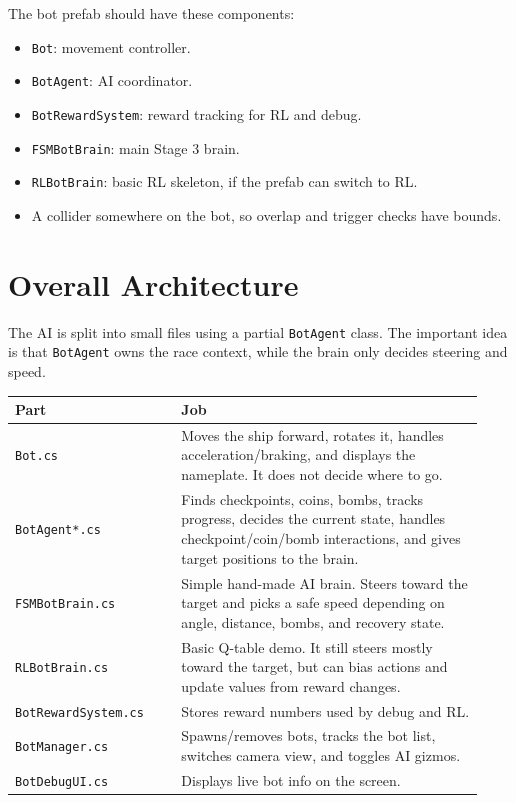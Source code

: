 \documentclass[11pt]{article}
\newcommand{\file}[1]{\texttt{#1}}
\newcommand{\code}[1]{{\footnotesize\texttt{#1}}}
\begin{document}
The bot prefab should have these components:

\begin{itemize}
    \item \code{Bot}: movement controller.
    \item \code{BotAgent}: AI coordinator.
    \item \code{BotRewardSystem}: reward tracking for RL and debug.
    \item \code{FSMBotBrain}: main Stage 3 brain.
    \item \code{RLBotBrain}: basic RL skeleton, if the prefab can switch to RL.
    \item A collider somewhere on the bot, so overlap and trigger checks have bounds.
\end{itemize}

\section{Overall Architecture}

The AI is split into small files using a partial \code{BotAgent} class. The important idea is that \code{BotAgent} owns the race context, while the brain only decides steering and speed.

\begin{longtable}{>{\raggedright\arraybackslash}p{0.33\linewidth}>{\raggedright\arraybackslash}p{0.60\linewidth}}
\textbf{Part} & \textbf{Job} \\
\hline
\file{Bot.cs} & Moves the ship forward, rotates it, handles acceleration/braking, and displays the nameplate. It does not decide where to go. \\
\file{BotAgent*.cs} & Finds checkpoints, coins, bombs, tracks progress, decides the current state, handles checkpoint/coin/bomb interactions, and gives target positions to the brain. \\
\file{FSMBotBrain.cs} & Simple hand-made AI brain. Steers toward the target and picks a safe speed depending on angle, distance, bombs, and recovery state. \\
\file{RLBotBrain.cs} & Basic Q-table demo. It still steers mostly toward the target, but can bias actions and update values from reward changes. \\
\file{BotRewardSystem.cs} & Stores reward numbers used by debug and RL. \\
\file{BotManager.cs} & Spawns/removes bots, tracks the bot list, switches camera view, and toggles AI gizmos. \\
\file{BotDebugUI.cs} & Displays live bot info on the screen. \\
\end{longtable}
\end{document}
